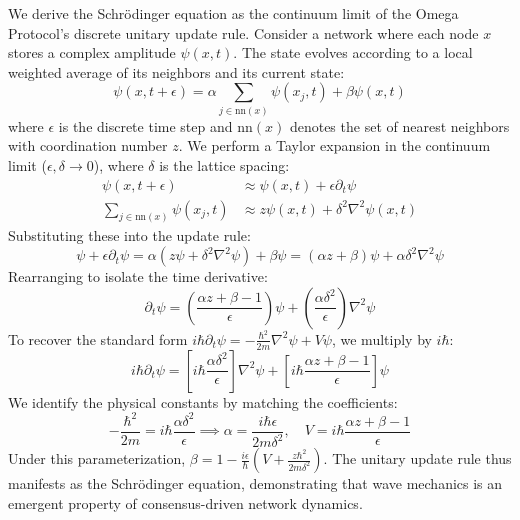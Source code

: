 \documentclass[11pt,template]{article}
\begin{document}
We derive the Schrödinger equation as the continuum limit of the Omega Protocol's discrete unitary update rule. Consider a network where each node $x$ stores a complex amplitude $\psi(x, t)$. The state evolves according to a local weighted average of its neighbors and its current state:
\begin{equation}
    \psi(x, t+\epsilon) = \alpha \sum_{j \in \text{nn}(x)} \psi(x_j, t) + \beta \psi(x, t)
\end{equation}
where $\epsilon$ is the discrete time step and $\text{nn}(x)$ denotes the set of nearest neighbors with coordination number $z$. We perform a Taylor expansion in the continuum limit ($\epsilon, \delta \to 0$), where $\delta$ is the lattice spacing:
\begin{align}
    \psi(x, t+\epsilon) &\approx \psi(x, t) + \epsilon \partial_t \psi \\
    \sum_{j \in \text{nn}(x)} \psi(x_j, t) &\approx z \psi(x, t) + \delta^2 \nabla^2 \psi(x, t)
\end{align}
Substituting these into the update rule:
\begin{equation}
    \psi + \epsilon \partial_t \psi = \alpha (z \psi + \delta^2 \nabla^2 \psi) + \beta \psi = (\alpha z + \beta) \psi + \alpha \delta^2 \nabla^2 \psi
\end{equation}
Rearranging to isolate the time derivative:
\begin{equation}
    \partial_t \psi = \left( \frac{\alpha z + \beta - 1}{\epsilon} \right) \psi + \left( \frac{\alpha \delta^2}{\epsilon} \right) \nabla^2 \psi
\end{equation}
To recover the standard form $i\hbar \partial_t \psi = -\frac{\hbar^2}{2m} \nabla^2 \psi + V \psi$, we multiply by $i\hbar$:
\begin{equation}
    i\hbar \partial_t \psi = \left[ i\hbar \frac{\alpha \delta^2}{\epsilon} \right] \nabla^2 \psi + \left[ i\hbar \frac{\alpha z + \beta - 1}{\epsilon} \right] \psi
\end{equation}
We identify the physical constants by matching the coefficients:
\begin{equation}
    -\frac{\hbar^2}{2m} = i\hbar \frac{\alpha \delta^2}{\epsilon} \implies \alpha = \frac{i \hbar \epsilon}{2m \delta^2}, \quad V = i\hbar \frac{\alpha z + \beta - 1}{\epsilon}
\end{equation}
Under this parameterization, $\beta = 1 - \frac{i\epsilon}{\hbar}(V + \frac{z \hbar^2}{2m \delta^2})$. The unitary update rule thus manifests as the Schrödinger equation, demonstrating that wave mechanics is an emergent property of consensus-driven network dynamics.
\end{document}
